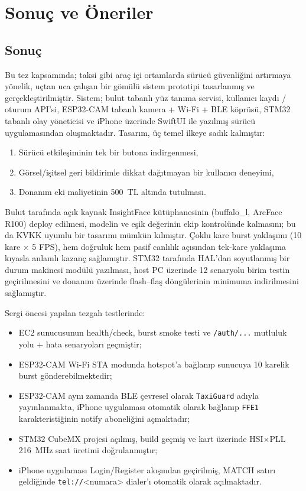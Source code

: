 \chapter{Sonuç ve Öneriler}
\label{ch:sonuc-oneriler}

\section{Sonuç}

Bu tez kapsamında; taksi gibi araç içi ortamlarda sürücü güvenliğini
artırmaya yönelik, uçtan uca çalışan bir gömülü sistem prototipi
tasarlanmış ve gerçekleştirilmiştir. Sistem; bulut tabanlı yüz tanıma
servisi, kullanıcı kaydı / oturum API'si, ESP32-CAM tabanlı kamera +
Wi-Fi + BLE köprüsü, STM32 tabanlı olay yöneticisi ve iPhone üzerinde
SwiftUI ile yazılmış sürücü uygulamasından oluşmaktadır. Tasarım, üç
temel ilkeye sadık kalmıştır:

\begin{enumerate}
    \item Sürücü etkileşiminin tek bir butona indirgenmesi,
    \item Görsel/işitsel geri bildirimle dikkat dağıtmayan bir kullanıcı
          deneyimi,
    \item Donanım eki maliyetinin 500~TL altında tutulması.
\end{enumerate}

Bulut tarafında açık kaynak InsightFace kütüphanesinin (buffalo\_l, ArcFace
R100) deploy edilmesi, modelin ve eşik değerinin ekip kontrolünde
kalmasını; bu da KVKK uyumlu bir tasarımı mümkün kılmıştır. Çoklu kare
burst yaklaşımı (10 kare $\times$ 5 FPS), hem doğruluk hem pasif canlılık
açısından tek-kare yaklaşıma kıyasla anlamlı kazanç sağlamıştır. STM32
tarafında HAL'dan soyutlanmış bir durum makinesi modülü yazılması, host
PC üzerinde 12 senaryolu birim testin geçirilmesini ve donanım üzerinde
flash--flaş döngülerinin minimuma indirilmesini sağlamıştır.

Sergi öncesi yapılan tezgah testlerinde:

\begin{itemize}
    \item EC2 sunucusunun health/check, burst smoke testi ve \texttt{/auth/...}
          mutluluk yolu + hata senaryoları geçmiştir;
    \item ESP32-CAM Wi-Fi STA modunda hotspot'a bağlanıp sunucuya 10
          karelik burst gönderebilmektedir;
    \item ESP32-CAM aynı zamanda BLE çevresel olarak \texttt{TaxiGuard}
          adıyla yayınlanmakta, iPhone uygulaması otomatik olarak bağlanıp
          \texttt{FFE1} karakteristiğinin notify aboneliğini açmaktadır;
    \item STM32 CubeMX projesi açılmış, build geçmiş ve kart üzerinde
          HSI$\times$PLL 216~MHz saat üretimi doğrulanmıştır;
    \item iPhone uygulaması Login/Register akışından geçirilmiş, MATCH
          satırı geldiğinde \texttt{tel://}<numara> dialer'ı otomatik
          olarak açılmaktadır.
\end{itemize}

